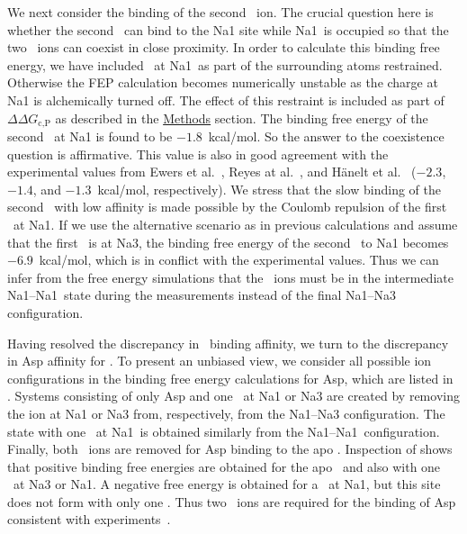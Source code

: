 We next consider the binding of the second \Na\ ion. The crucial question here is whether the
second \Na\ can bind to the Na1 site while Na1\prim\ is occupied so that the two \Na\ ions can 
coexist in close proximity. In order to calculate this binding free energy, we have included \Na\ 
at Na1\prim\ as part of the surrounding atoms restrained. Otherwise the FEP calculation becomes 
numerically unstable as the charge at Na1 is alchemically turned off. The effect of this restraint 
is included as part of $\Delta\Delta G_{\text{c,P}}$ as described in the \hyperref[bind:method]{Methods} 
section. The binding free energy of the second \Na\ at Na1 is found to be $-1.8$~kcal/mol. So the 
answer to the coexistence question is affirmative. This value is also in good agreement with the 
experimental values from Ewers et al.~\cite{Ewers2013}, Reyes at al.~\cite{Reyes2013b}, and H\"{a}nelt 
et al.~\cite{Hanelt2015} ($-2.3$, $-1.4$, and $-1.3$~kcal/mol, respectively). We stress that the slow 
binding of the second \Na\ with low affinity is made possible by the Coulomb repulsion of the first 
\Na\ at Na1\prim. If we use the alternative scenario as in previous calculations and assume that the 
first \Na\ is at Na3, the binding free energy of the second \Na\ to Na1 becomes $-6.9$~kcal/mol, which 
is in conflict with the experimental values. Thus we can infer from the free energy simulations that 
the \Na\ ions must be in the intermediate Na1--Na1\prim\ state during the measurements instead of the 
final Na1--Na3 configuration.

Having resolved the discrepancy in \Na\ binding affinity, we turn to the discrepancy in Asp affinity
for \GltPh. To present an unbiased view, we consider all possible ion configurations in the binding 
free energy calculations for Asp, which are listed in \tabref{bind:tab3}. Systems consisting of only 
Asp and one \Na\ at Na1 or Na3 are created by removing the ion at Na1 or Na3 from, respectively, from 
the Na1--Na3 configuration. The state with one \Na\ at Na1\prim\ is obtained similarly from the 
Na1--Na1\prim\ configuration. Finally, both \Na\ ions are removed for Asp binding to the apo \GltPh. 
Inspection of \tabref{bind:tab3} shows that positive binding free energies are obtained for the apo 
\GltPh\ and also with one \Na\ at Na3 or Na1\prim. A negative free energy is obtained for a \Na\ at 
Na1, but this site does not form with only one \Na. Thus two \Na\ ions are required for the binding of 
Asp consistent with experiments~\cite{Vandenberg2013,Tao2010,Reyes2013b,Ewers2013,Hanelt2015}.

